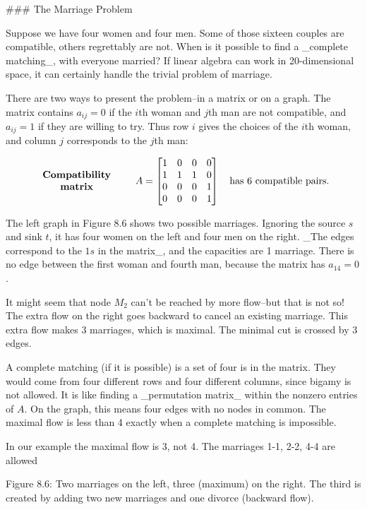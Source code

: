 

### The Marriage Problem

Suppose we have four women and four men. Some of those sixteen couples are compatible, others regrettably are not. When is it possible to find a _complete matching_, with everyone married? If linear algebra can work in 20-dimensional space, it can certainly handle the trivial problem of marriage.

There are two ways to present the problem--in a matrix or on a graph. The matrix contains \(a_{ij}=0\) if the \(i\)th woman and \(j\)th man are not compatible, and \(a_{ij}=1\) if they are willing to try. Thus row \(i\) gives the choices of the \(i\)th woman, and column \(j\) corresponds to the \(j\)th man:

\[\begin{array}{c}\mbox{\bf Compatibility}\\ \mbox{\bf matrix}\end{array}\qquad A=\begin{bmatrix}1&0&0&0\\ 1&1&1&0\\ 0&0&0&1\\ 0&0&0&1\end{bmatrix}\quad\mbox{has 6 compatible pairs.}\]

The left graph in Figure 8.6 shows two possible marriages. Ignoring the source \(s\) and sink \(t\), it has four women on the left and four men on the right. _The edges correspond to the \(1s\) in the matrix_, and the capacities are 1 marriage. There is no edge between the first woman and fourth man, because the matrix has \(a_{14}=0\).

It might seem that node \(M_{2}\) can't be reached by more flow--but that is not so! The extra flow on the right goes backward to cancel an existing marriage. This extra flow makes 3 marriages, which is maximal. The minimal cut is crossed by 3 edges.

A complete matching (if it is possible) is a set of four is in the matrix. They would come from four different rows and four different columns, since bigamy is not allowed. It is like finding a _permutation matrix_ within the nonzero entries of \(A\). On the graph, this means four edges with no nodes in common. The maximal flow is less than 4 exactly when a complete matching is impossible.

In our example the maximal flow is 3, not 4. The marriages 1-1, 2-2, 4-4 are allowed

Figure 8.6: Two marriages on the left, three (maximum) on the right. The third is created by adding two new marriages and one divorce (backward flow).

